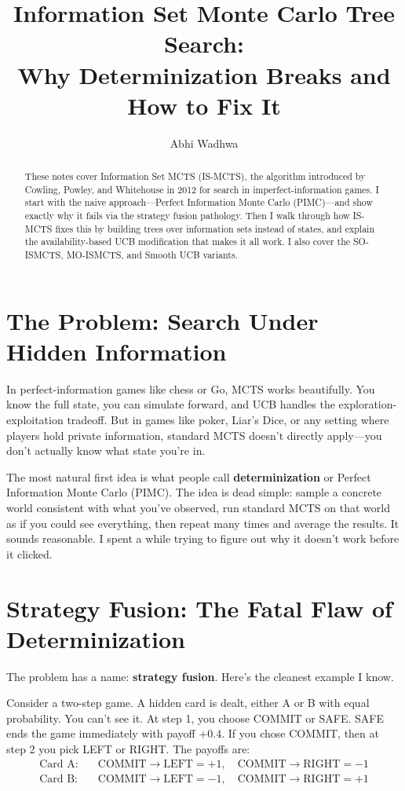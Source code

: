 \documentclass[11pt]{article}
\title{Information Set Monte Carlo Tree Search:\\Why Determinization Breaks and How to Fix It}
\author{Abhi Wadhwa}
\date{}
\begin{document}
\maketitle

\begin{abstract}
These notes cover Information Set MCTS (IS-MCTS), the algorithm introduced by Cowling, Powley, and Whitehouse in 2012 for search in imperfect-information games. I start with the naive approach---Perfect Information Monte Carlo (PIMC)---and show exactly why it fails via the strategy fusion pathology. Then I walk through how IS-MCTS fixes this by building trees over information sets instead of states, and explain the availability-based UCB modification that makes it all work. I also cover the SO-ISMCTS, MO-ISMCTS, and Smooth UCB variants.
\end{abstract}

\section{The Problem: Search Under Hidden Information}

In perfect-information games like chess or Go, MCTS works beautifully. You know the full state, you can simulate forward, and UCB handles the exploration-exploitation tradeoff. But in games like poker, Liar's Dice, or any setting where players hold private information, standard MCTS doesn't directly apply---you don't actually know what state you're in.

The most natural first idea is what people call \textbf{determinization} or Perfect Information Monte Carlo (PIMC). The idea is dead simple: sample a concrete world consistent with what you've observed, run standard MCTS on that world as if you could see everything, then repeat many times and average the results. It sounds reasonable. I spent a while trying to figure out why it doesn't work before it clicked.

\section{Strategy Fusion: The Fatal Flaw of Determinization}

The problem has a name: \textbf{strategy fusion}. Here's the cleanest example I know.

Consider a two-step game. A hidden card is dealt, either A or B with equal probability. You can't see it. At step 1, you choose COMMIT or SAFE. SAFE ends the game immediately with payoff $+0.4$. If you chose COMMIT, then at step 2 you pick LEFT or RIGHT. The payoffs are:
\begin{align*}
\text{Card A:} \quad &\text{COMMIT} \to \text{LEFT} = +1, \quad \text{COMMIT} \to \text{RIGHT} = -1 \\
\text{Card B:} \quad &\text{COMMIT} \to \text{LEFT} = -1, \quad \text{COMMIT} \to \text{RIGHT} = +1
\end{align*}
\end{document}
